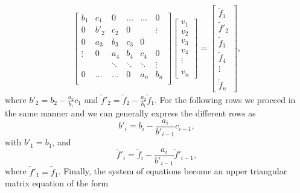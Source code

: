 \documentclass[a4paper]{article}
\begin{document}
\begin{align}
  \begin{bmatrix}
    b_1 & c_1 & 0  & \hdots & \hdots &   0    \\
    0 & b'_2 & c_2 & 0      & &\vdots \\
    0 & a_3 & b_3  & c_3     & 0 &  \\
    \vdots & 0 & a_4  & b_4     & c_4 & 0 \\
    & & \ddots & \ddots & \ddots & \vdots\\
    0 & \hdots  &\hdots & 0 &a_n & b_n \\
  \end{bmatrix}
  \begin{bmatrix}
    v_1 \\ v_2 \\ v_3 \\ v_4 \\ \vdots \\ \\ v_n
  \end{bmatrix}
  =
  \begin{bmatrix}
    \tilde{f}_1 \\ \tilde{f}'_2 \\ \tilde{f}_3 \\ \tilde{f}_4 \\ \vdots \\ \\ \tilde{f}_n
  \end{bmatrix},
  \label{eqg2}
\end{align}
where $b'_2 = b_2 - \frac{a_2}{b_1} c_1$ and $\tilde{f}'_2 = \tilde{f}_2 - \frac{a_2}{b_1}\tilde{f}_1$. For the following rows we proceed in the same manner and we can generally express the different rows as
\begin{equation}
  b'_i = b_i - \frac{a_i}{b'_{i-1}}c_{i-1},
  \label{forward1}
\end{equation}
with $b'_1 = b_1$, and
\begin{equation}
  \tilde{f}'_{i} = \tilde{f}_i - \frac{a_i}{b'_{i-1}}\tilde{f}'_{i-1},
  \label{forward2}
\end{equation}
where $\tilde{f}'_1 = \tilde{f}_1$. Finally, the system of equations become an upper triangular matrix equation of the form
\end{document}
